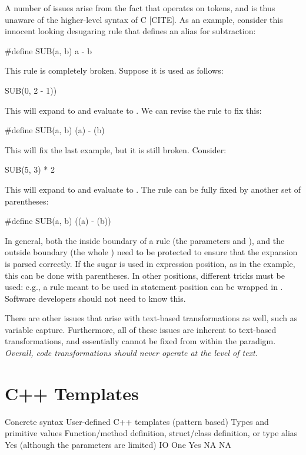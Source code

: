 A number of issues arise from the fact that  operates on tokens, and
is thus unaware of the higher-level syntax of C [CITE].
As an example, consider this innocent looking
 desugaring rule that defines an alias for subtraction:
\begin{Codes}
  #define SUB(a, b) a - b
\end{Codes}
This rule is completely broken. Suppose it is used as follows:
\begin{Codes}
  SUB(0, 2 - 1))
\end{Codes}
This will expand to  and evaluate to .
We can revise the rule to fix this:
\begin{Codes}
  #define SUB(a, b) (a) - (b)
\end{Codes}
This will fix the last example, but it is still broken. Consider:
\begin{Codes}
  SUB(5, 3) * 2
\end{Codes}
This will expand to  and evaluate to .
The rule can be fully fixed by another set of parentheses:
\begin{Codes}
  #define SUB(a, b) ((a) - (b))
\end{Codes}
In general, both the inside boundary of a rule (the parameters 
and ), and the outside boundary (the whole ) need
to be protected to ensure that the expansion is parsed correctly. If
the sugar is used in expression position, as in the 
example, this can be done with parentheses. In other positions,
different tricks must be used: e.g., a rule meant to be used in
statement position can be wrapped in .
Software developers should not need to know this.

There are other issues that arise with text-based transformations as
well, such as variable capture. Furthermore, all of these issues are
inherent to text-based transformations, and essentially cannot be
fixed from within the paradigm. \emph{Overall, code transformations
  should never operate at the level of text.}

\section{C++ Templates} \label{sec:cpp}

 Concrete syntax
 User-defined
 C++ templates (pattern based)
 Types and primitive values
 Function/method definition, struct/class definition, or type alias
 Yes (although the parameters are limited)
 IO
 One
 Yes
 NA
 NA

